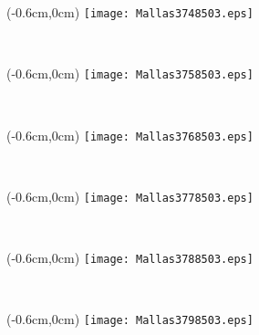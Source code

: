 \documentclass[12pt,letterpaper,oneside]{report}
\begin{document}
\begin{textblock*}{\paperwidth}(-0.6cm,0cm)
\texttt{[image: Mallas3748503.eps]}
\end{textblock*}

\ \pagebreak
\begin{textblock*}{\paperwidth}(-0.6cm,0cm)
\texttt{[image: Mallas3758503.eps]}
\end{textblock*}

\ \pagebreak
\begin{textblock*}{\paperwidth}(-0.6cm,0cm)
\texttt{[image: Mallas3768503.eps]}
\end{textblock*}

\ \pagebreak
\begin{textblock*}{\paperwidth}(-0.6cm,0cm)
\texttt{[image: Mallas3778503.eps]}
\end{textblock*}

\ \pagebreak
\begin{textblock*}{\paperwidth}(-0.6cm,0cm)
\texttt{[image: Mallas3788503.eps]}
\end{textblock*}

\ \pagebreak
\begin{textblock*}{\paperwidth}(-0.6cm,0cm)
\texttt{[image: Mallas3798503.eps]}
\end{textblock*}

\ \pagebreak
\end{document}
